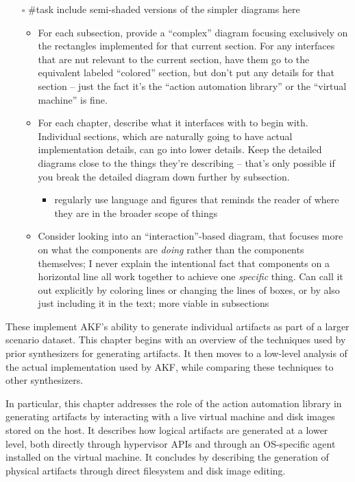 \documentclass[letterpaper,12pt]{report}
\def\tightlist{}
\begin{document}
\begin{itemize}
\tightlist
\item[$\square$]
  \#task include semi-shaded versions of the simpler diagrams here

  \begin{itemize}
  \tightlist
  \item
    For each subsection, provide a ``complex'' diagram focusing
    exclusively on the rectangles implemented for that current section.
    For any interfaces that are nut relevant to the current section,
    have them go to the equivalent labeled ``colored'' section, but
    don't put any details for that section -- just the fact it's the
    ``action automation library'' or the ``virtual machine'' is fine.
  \item
    For each chapter, describe what it interfaces with to begin with.
    Individual sections, which are naturally going to have actual
    implementation details, can go into lower details. Keep the detailed
    diagrams close to the things they're describing -- that's only
    possible if you break the detailed diagram down further by
    subsection.

    \begin{itemize}
    \tightlist
    \item
      regularly use language and figures that reminds the reader of
      where they are in the broader scope of things
    \end{itemize}
  \item
    Consider looking into an ``interaction''-based diagram, that focuses
    more on what the components are \emph{doing} rather than the
    components themselves; I never explain the intentional fact that
    components on a horizontal line all work together to achieve one
    \emph{specific} thing. Can call it out explicitly by coloring lines
    or changing the lines of boxes, or by also just including it in the
    text; more viable in subsections
  \end{itemize}
\end{itemize}

These implement AKF's ability to generate individual artifacts as part
of a larger scenario dataset. This chapter begins with an overview of
the techniques used by prior synthesizers for generating artifacts. It
then moves to a low-level analysis of the actual implementation used by
AKF, while comparing these techniques to other synthesizers.

In particular, this chapter addresses the role of the action automation
library in generating artifacts by interacting with a live virtual
machine and disk images stored on the host. It describes how logical
artifacts are generated at a lower level, both directly through
hypervisor APIs and through an OS-specific agent installed on the
virtual machine. It concludes by describing the generation of physical
artifacts through direct filesystem and disk image editing.
\end{document}
